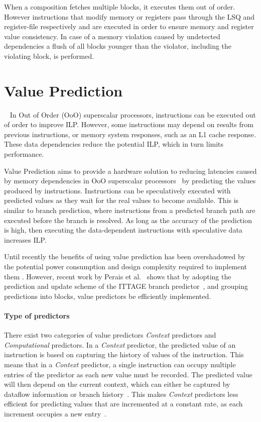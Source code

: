 When a composition fetches multiple blocks, it executes them out of order.
However instructions that modify memory or registers pass through the LSQ and register-file respectively and are executed in order to ensure memory and register value consistency.
In case of a memory violation caused by undetected dependencies a flush of all blocks younger than the violator, including the violating block, is performed.

\section{Value Prediction}~\label{sec:valpred}
In Out of Order (OoO) superscalar processors, instructions can be executed out of order to improve ILP.
However, some instructions may depend on results from previous instructions, or memory system responses, such as an L1 cache response.
These data dependencies reduce the potential ILP, which in turn limits performance.

Value Prediction aims to provide a hardware solution to reducing latencies caused by memory dependencies in OoO superscalar processors~\cite{gabbayVPOrig} by predicting the values produced by instructions.
Instructions can be speculatively executed with predicted values as they wait for the real values to become available.
This is similar to branch prediction, where instructions from a predicted branch path are executed before the branch is resolved.
As long as the accuracy of the prediction is high, then executing the data-dependent instructions with speculative data increases ILP.

Until recently the benefits of using value prediction has been overshadowed by the potential power consumption and design complexity required to implement them \cite{peraisVTAGE2014}.
However, recent work by Perais et al.~\cite{peraisVTAGE2014,peraisBeBop2015} shows that by adopting the prediction and update scheme of the ITTAGE branch predictor~\cite{SeznecITTAGE}, and grouping predictions into blocks, value predictors be efficiently implemented.

\paragraph*{Type of predictors}
There exist two categories of value predictors \textit{Context} predictors and \textit{Computational} predictors.
In a \textit{Context} predictor, the predicted value of an instruction is based on capturing the history of values of the instruction.
This means that in a \textit{Context} predictor, a single instruction can occupy multiple entries of the predictor as each new value must be recorded.
The predicted value will then depend on the current context, which can either be captured by dataflow information or branch history~\cite{peraisVTAGE2014}.
This makes \textit{Context} predictors less efficient for predicting values that are incremented at a constant rate, as each increment occupies a new entry~\cite{peraisBeBop2015}.

